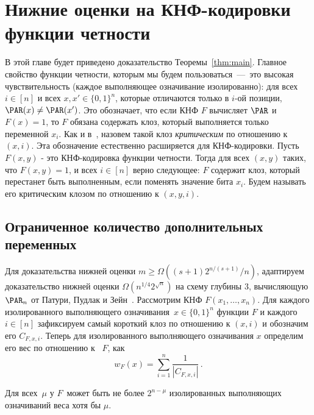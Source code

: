 \section{Нижние оценки на КНФ-кодировки функции четности}
В этой главе будет приведено доказательство Теоремы~\ref{thm:main}.
Главное свойство функции четности, которым мы будем пользоваться~---~это высокая чувствительность 
(каждое выполняющее означивание изолированно):
для всех $i \in [n]$ и всех $x,x' \in \{0,1\}^n$, которые отличаются только в $i$-ой позиции,
$\PAR(x) \neq \PAR(x')$.
Это обозначает, что если КНФ $F$ вычисляет $\PAR$ и $F(x) = 1$, то $F$ обязана содержать клоз, 
который выполняется только переменной $x_i$.
Как и в~\cite{DBLP:journals/cjtcs/PaturiPZ99}, назовем такой клоз \emph{критическим} по отношению к $(x,i)$.
Эта обозначение естественно расширяется для КНФ-кодировки. Пусть $F(x, y)$ - это КНФ-кодировка функции четности.
Тогда для всех $(x, y)$ таких, что $F(x, y) = 1$, и всех $i \in [n]$ верно следующее: $F$ содержит клоз,
который перестанет быть выполненным, если поменять значение бита $x_i$. 
Будем называть его критическим клозом по отношению к $(x, y, i)$.
\subsection{Ограниченное количество дополнительных переменных}
Для доказательства нижней оценки $m \ge \Omega((s+1)2^{n/(s+1)}/n)$, адаптируем доказательство нижней оценки $\Omega(n^{1/4}2^{\sqrt n})$ на схему глубины $3$, вычисляющую $\PAR_n$ 
от Патури, Пудлак и Зейн~\cite{DBLP:journals/cjtcs/PaturiPZ99}. 
Рассмотрим КНФ $F(x_1, \dotsc, x_n)$.
Для каждого изолированного выполняющего означивания~$x \in \{0,1\}^n$ функции $F$ и каждого~$i \in [n]$ зафиксируем самый короткий клоз по отношению к $(x,i)$ и обозначим его $C_{F,x,i}$.
Теперь для изолированного выполняющего означивания $x$ определим его вес по отношению к ~$F$, как 
\[w_F(x) = \sum\limits_{i=1}^n \frac{1}{|C_{F,x,i}|} \, .\]

\begin{lemma}\label{lemma:isolatedweight}
	Для всех~$\mu$ у $F$~может быть не более $2^{n - \mu}$ изолированных выполняющих означиваний 
	веса хотя бы $\mu$.
\end{lemma}

